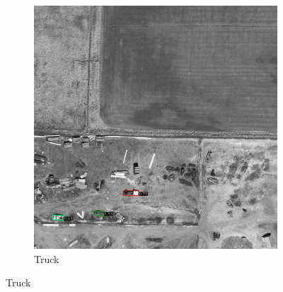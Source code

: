\begin{figure}[h!]
\begin{subfigure}[t]{0.38\textwidth}
        \includegraphics[width=\linewidth]{images/015Results/03ablation/comp_images/red/212.png}
        \caption{Truck}
    \end{subfigure}
    

\end{figure}
